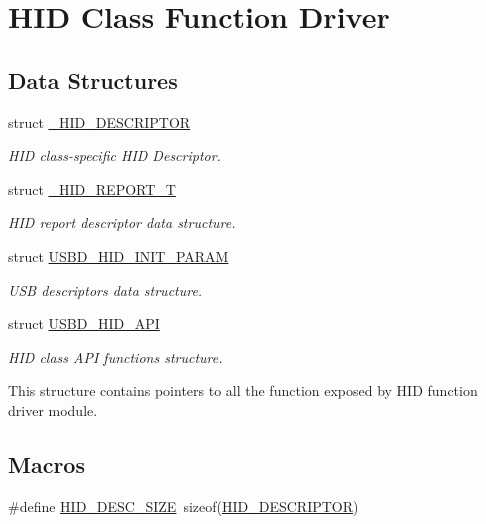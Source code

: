 \hypertarget{group__USBD__HID}{\section{H\-I\-D Class Function Driver}
\label{group__USBD__HID}
}
\subsection*{Data Structures}
\begin{DoxyCompactItemize}
\item 
struct \hyperlink{struct__HID__DESCRIPTOR}{\-\_\-\-H\-I\-D\-\_\-\-D\-E\-S\-C\-R\-I\-P\-T\-O\-R}
\begin{DoxyCompactList}\small\item\em H\-I\-D class-\/specific H\-I\-D Descriptor. \end{DoxyCompactList}\item 
struct \hyperlink{struct__HID__REPORT__T}{\-\_\-\-H\-I\-D\-\_\-\-R\-E\-P\-O\-R\-T\-\_\-\-T}
\begin{DoxyCompactList}\small\item\em H\-I\-D report descriptor data structure. \end{DoxyCompactList}\item 
struct \hyperlink{structUSBD__HID__INIT__PARAM}{U\-S\-B\-D\-\_\-\-H\-I\-D\-\_\-\-I\-N\-I\-T\-\_\-\-P\-A\-R\-A\-M}
\begin{DoxyCompactList}\small\item\em U\-S\-B descriptors data structure. \end{DoxyCompactList}\item 
struct \hyperlink{structUSBD__HID__API}{U\-S\-B\-D\-\_\-\-H\-I\-D\-\_\-\-A\-P\-I}
\begin{DoxyCompactList}\small\item\em H\-I\-D class A\-P\-I functions structure.

This structure contains pointers to all the function exposed by H\-I\-D function driver module. \end{DoxyCompactList}\end{DoxyCompactItemize}
\subsection*{Macros}
\begin{DoxyCompactItemize}
\item 
\#define \hyperlink{group__USBD__HID_ga5ff0f82d743784b185a3a82a726733d9}{H\-I\-D\-\_\-\-D\-E\-S\-C\-\_\-\-S\-I\-Z\-E}~sizeof(\hyperlink{group__USBD__HID_ga683d4339556ecbba7d2062c3f90336e8}{H\-I\-D\-\_\-\-D\-E\-S\-C\-R\-I\-P\-T\-O\-R})
\end{DoxyCompactItemize}
